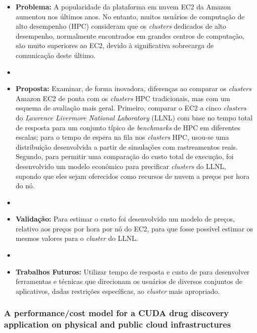 \documentclass[tese,capa]{texufpel}
\begin{document}
\begin{itemize}[label={},noitemsep]
  \item \textbf{Problema:} A popularidade da plataforma em nuvem EC2 da Amazon aumentou nos últimos anos. No entanto, muitos usuários de computação de alto desempenho (HPC) consideram que os \textit{clusters} dedicados de alto desempenho, normalmente encontrados em grandes centros de computação, são muito superiores ao EC2, devido à significativa sobrecarga de comunicação deste último.
  \item 
  \item \textbf{Proposta:} Examinar, de forma inovadora, diferenças ao comparar os \textit{clusters} Amazon EC2 de ponta com os \textit{clusters} HPC tradicionais, mas com um esquema de avaliação mais geral. Primeiro, comparar o EC2 a cinco \textit{clusters} do \textit{Lawrence Livermore National Laboratory} (LLNL) com base no tempo total de resposta para um conjunto típico de \textit{benchmarks} de HPC em diferentes escalas; para o tempo de espera na fila nos \textit{clusters} HPC, usou-se uma distribuição desenvolvida a partir de simulações com rastreamentos reais. Segundo, para permitir uma comparação do custo total de execução, foi desenvolvido um modelo econômico para precificar \textit{clusters} do LLNL, supondo que eles sejam oferecidos como recursos de nuvem a preços por hora do nó.
  \item 
  \item \textbf{Validação:} Para estimar o custo foi desenvolvido um modelo de preços, relativo aos preços por hora por nó do EC2, para que fosse possível estimar os mesmos valores para o \textit{cluster} do LLNL.
  \item 
  \item \textbf{Trabalhos Futuros:} Utilizar tempo de resposta e custo de para desenvolver ferramentas e técnicas que direcionam os usuários de diversos conjuntos de aplicativos, dadas restrições específicas, ao \textit{cluster} mais apropriado.  
\end{itemize}


\subsubsection{A performance/cost model for a CUDA drug discovery application on physical and public cloud infrastructures \cite{guerreroPerformanceCostModel2014b}}
\end{document}
